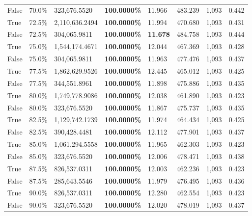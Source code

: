\begin{table}[H]
\begin{tabular}{lllrllll}
\cline{1-8}
False & 70.0\% & 323,676.5520 & \bfseries \color{red} 100.0000\% & 11.966 & 483.239 & 1,093 & 0.442 \\
\cline{1-8}
True & 72.5\% & 2,110,636.2494 & \bfseries \color{red} 100.0000\% & 11.994 & 470.680 & 1,093 & 0.431 \\
\cline{1-8}
False & 72.5\% & 304,065.9811 & \bfseries \color{red} 100.0000\% & \bfseries \color{red} 11.678 & 484.758 & 1,093 & 0.444 \\
\cline{1-8}
True & 75.0\% & 1,544,174.4671 & \bfseries \color{red} 100.0000\% & 12.044 & 467.369 & 1,093 & 0.428 \\
\cline{1-8}
False & 75.0\% & 304,065.9811 & \bfseries \color{red} 100.0000\% & 11.963 & 477.476 & 1,093 & 0.437 \\
\cline{1-8}
True & 77.5\% & 1,862,629.9526 & \bfseries \color{red} 100.0000\% & 12.445 & 465.012 & 1,093 & 0.425 \\
\cline{1-8}
False & 77.5\% & 344,551.8961 & \bfseries \color{red} 100.0000\% & 11.898 & 475.886 & 1,093 & 0.435 \\
\cline{1-8}
True & 80.0\% & 1,749,778.9086 & \bfseries \color{red} 100.0000\% & 12.038 & 461.890 & 1,093 & 0.423 \\
\cline{1-8}
False & 80.0\% & 323,676.5520 & \bfseries \color{red} 100.0000\% & 11.867 & 475.737 & 1,093 & 0.435 \\
\cline{1-8}
True & 82.5\% & 1,129,742.1739 & \bfseries \color{red} 100.0000\% & 11.974 & 464.434 & 1,093 & 0.425 \\
\cline{1-8}
False & 82.5\% & 390,428.4481 & \bfseries \color{red} 100.0000\% & 12.112 & 477.901 & 1,093 & 0.437 \\
\cline{1-8}
True & 85.0\% & 1,061,294.5558 & \bfseries \color{red} 100.0000\% & 11.965 & 462.303 & 1,093 & 0.423 \\
\cline{1-8}
False & 85.0\% & 323,676.5520 & \bfseries \color{red} 100.0000\% & 12.006 & 478.471 & 1,093 & 0.438 \\
\cline{1-8}
True & 87.5\% & 826,537.0311 & \bfseries \color{red} 100.0000\% & 12.003 & 462.236 & 1,093 & 0.423 \\
\cline{1-8}
False & 87.5\% & \color{red} 285,643.5546 & \bfseries \color{red} 100.0000\% & 11.979 & 476.495 & 1,093 & 0.436 \\
\cline{1-8}
True & 90.0\% & 826,537.0311 & \bfseries \color{red} 100.0000\% & 12.280 & 462.554 & 1,093 & 0.423 \\
\cline{1-8}
False & 90.0\% & 323,676.5520 & \bfseries \color{red} 100.0000\% & 12.020 & 478.019 & 1,093 & 0.437 \\

\end{tabular}
\end{table}
